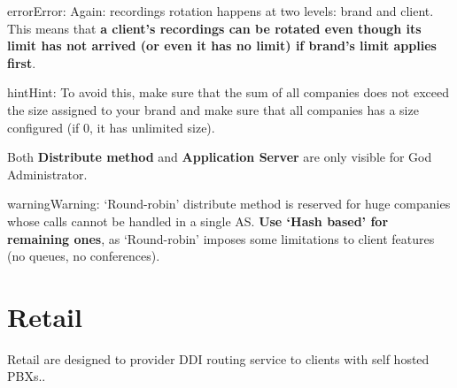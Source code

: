 \documentclass[letterpaper,10pt,english]{sphinxmanual}
\begin{document}
\begin{notice}{error}{Error:}
Again: recordings rotation happens at two levels: brand and client. This
means that \textbf{a client's recordings can be rotated even though its limit
has not arrived (or even it has no limit) if brand's limit applies first}.
\end{notice}

\begin{notice}{hint}{Hint:}
To avoid this, make sure that the sum of all companies does not exceed
the size assigned to your brand and make sure that all companies has
a size configured (if 0, it has unlimited size).
\end{notice}

Both \textbf{Distribute method} and \textbf{Application Server} are only visible for God
Administrator.

\begin{notice}{warning}{Warning:}
`Round-robin' distribute method is reserved for huge companies
whose calls cannot be handled in a single AS. \textbf{Use `Hash based'
for remaining ones}, as `Round-robin' imposes some limitations
to client features (no queues, no conferences).
\end{notice}


\section{Retail}
\label{brand/retail:retail-clients}\label{brand/retail:retail}\label{brand/retail::doc}
Retail are designed to provider DDI routing service to clients with self hosted PBXs..
\end{document}
